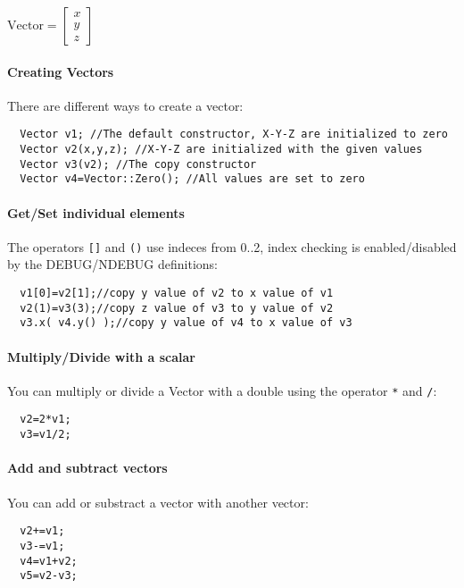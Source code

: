 \documentclass[a4paper,10pt]{report}
\begin{document}
$\mathrm{Vector} = \left[\begin{array}{c} x \\ y \\ z \end{array} \right]$

\paragraph{Creating Vectors}
\label{sec:creating-vectors}
There are different ways to create a vector:
\begin{lstlisting}
  Vector v1; //The default constructor, X-Y-Z are initialized to zero
  Vector v2(x,y,z); //X-Y-Z are initialized with the given values
  Vector v3(v2); //The copy constructor
  Vector v4=Vector::Zero(); //All values are set to zero
\end{lstlisting}

\paragraph{Get/Set individual elements}
\label{sec:gets-indiv-elem}
The operators \lstinline$[]$ and \lstinline$()$ use indeces from 0..2,
index checking is enabled/disabled by the DEBUG/NDEBUG definitions:
\begin{lstlisting}
  v1[0]=v2[1];//copy y value of v2 to x value of v1 
  v2(1)=v3(3);//copy z value of v3 to y value of v2
  v3.x( v4.y() );//copy y value of v4 to x value of v3
\end{lstlisting}

\paragraph{Multiply/Divide with a scalar}
\label{sec:mult-with-scal}
You can multiply or divide a Vector with a double using the operator
\lstinline$*$ and \lstinline$/$:
\begin{lstlisting}
  v2=2*v1;
  v3=v1/2;
\end{lstlisting}

\paragraph{Add and subtract vectors}
\label{sec:add-subtract-vectors}
You can add or substract a vector with another vector:
\begin{lstlisting}
  v2+=v1;
  v3-=v1;
  v4=v1+v2;
  v5=v2-v3;
\end{lstlisting}
\end{document}
